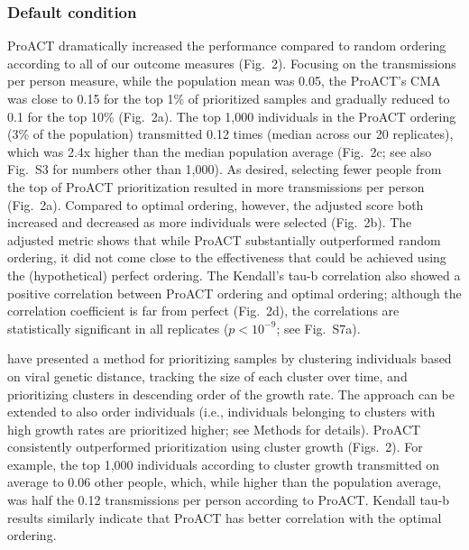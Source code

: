 \documentclass[a4paper,11pt]{article}
\newcommand{\authorcite}[1]{\citeauthor{#1}\supercite{#1}}
\newcommand{\TODO}[1]{{\color{red} #1} }
\newcommand{\PLWH}{sample\xspace}
\begin{document}
\subsubsection{Default condition}
ProACT dramatically increased the performance compared to random ordering according to all of our outcome measures (Fig.~2).
Focusing on the transmissions per person measure, while the population mean was 0.05, the ProACT's CMA was close to 0.15 for the top 1\% of prioritized \PLWH{s} and gradually reduced to 0.1 for the top 10\% (Fig.~2a).
The top 1,000 individuals in the ProACT ordering (3\% of the population)  transmitted {0.12} times (median across our 20 replicates), which was 2.4x  higher than the median population average (Fig.~2c; see also Fig.~S3 for numbers other than 1,000).
As desired, selecting fewer people from the top of ProACT prioritization resulted in more transmissions per person (Fig.~2a).
Compared to optimal ordering, however, the adjusted score both increased and decreased as more individuals were selected (Fig.~2b). 
The adjusted metric shows that while ProACT substantially outperformed random ordering, it did not come close to the effectiveness that could be achieved using the (hypothetical) perfect ordering. 
The Kendall's tau-b correlation also showed a positive correlation between ProACT ordering and optimal ordering;  although the correlation coefficient is far from perfect (Fig.~2d), the correlations are statistically significant in all replicates ($p<10^{-9}$; see Fig.~S7a).




\authorcite{Wertheim2018} have presented a method for prioritizing \PLWH{s} by clustering individuals based on viral genetic distance, tracking the size of each cluster over time, and prioritizing clusters in descending order of the growth rate. The approach can be extended to also order individuals (i.e., individuals belonging to clusters with high growth rates are prioritized higher; see Methods for details).
ProACT consistently outperformed prioritization using cluster growth  (Figs.~2).
For example, the top 1,000 individuals according to cluster growth transmitted on average to 0.06 other people, which, while higher than the population average, was half the 0.12 transmissions per person according to ProACT. 
Kendall tau-b results similarly indicate that ProACT has better correlation with the optimal ordering.
\end{document}
